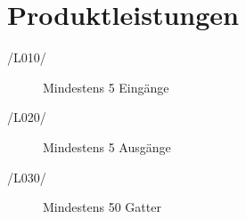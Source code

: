 
\section{Produktleistungen}


\begin{description}
	\item[/L010/] Mindestens 5 Eingänge
	\item[/L020/] Mindestens 5 Ausgänge
	\item[/L030/] Mindestens 50 Gatter
\end{description}

